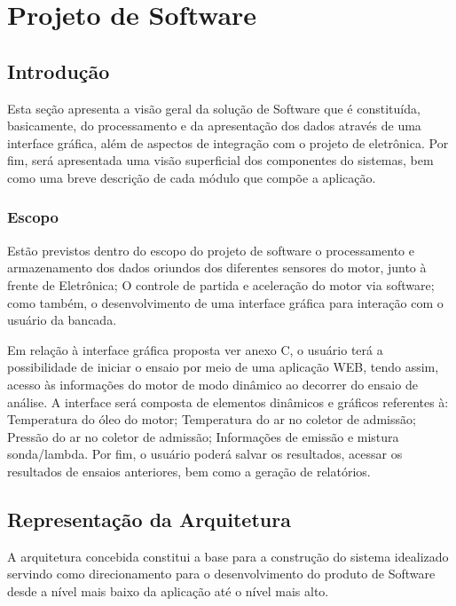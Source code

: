 \chapter[Projeto de Software]{Projeto de Software}

\section{Introdução}

Esta seção apresenta a visão geral da solução de Software que é constituída, basicamente, do processamento e da apresentação dos dados através de uma interface gráfica, além de aspectos de integração com o projeto de eletrônica. Por fim, será apresentada uma visão superficial dos componentes do sistemas, bem como uma breve descrição de cada módulo que compõe a aplicação. 

\subsection{Escopo}

Estão previstos dentro do escopo do projeto de software o processamento e armazenamento dos dados oriundos dos diferentes sensores do motor, junto à frente de Eletrônica; O controle de partida e aceleração do motor via software; como também, o desenvolvimento de uma interface gráfica para interação com o usuário da bancada.

Em relação à interface gráfica proposta ver anexo C, o usuário terá a possibilidade de iniciar o ensaio por meio de uma aplicação WEB, tendo assim, acesso às informações do motor de modo dinâmico ao decorrer do ensaio de análise. A interface será composta de elementos dinâmicos e gráficos referentes à: Temperatura do óleo do motor; Temperatura do ar no coletor de admissão; Pressão do ar no coletor de admissão; Informações de emissão e mistura sonda/lambda. Por fim, o usuário poderá salvar os resultados, acessar os resultados de ensaios anteriores, bem como a geração de relatórios.

\section{Representação da Arquitetura}

A arquitetura concebida constitui a base para a construção do sistema idealizado servindo como direcionamento para o desenvolvimento do produto de Software desde a nível mais baixo da aplicação até o nível mais alto.

